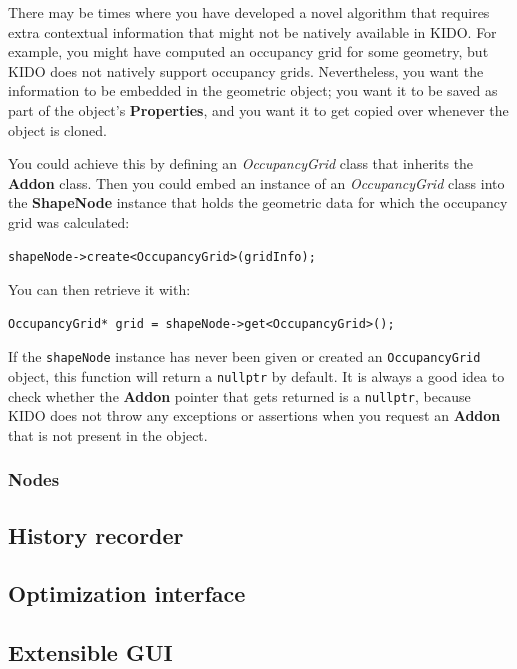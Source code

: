 There may be times where you have developed a novel algorithm that requires extra contextual information that might not be natively available in KIDO. For example, you might have computed an occupancy grid for some geometry, but KIDO does not natively support occupancy grids. Nevertheless, you want the information to be embedded in the geometric object; you want it to be saved as part of the object's \textbf{Properties}, and you want it to get copied over whenever the object is cloned.

You could achieve this by defining an \textit{OccupancyGrid} class that inherits the \textbf{Addon} class. Then you could embed an instance of an \textit{OccupancyGrid} class into the \textbf{ShapeNode} instance that holds the geometric data for which the occupancy grid was calculated:

\begin{lstlisting}
shapeNode->create<OccupancyGrid>(gridInfo);
\end{lstlisting}

You can then retrieve it with:

\begin{lstlisting}
OccupancyGrid* grid = shapeNode->get<OccupancyGrid>();
\end{lstlisting}

If the \texttt{shapeNode} instance has never been given or created an \texttt{OccupancyGrid} object, this function will return a \texttt{nullptr} by default. It is always a good idea to check whether the \textbf{Addon} pointer that gets returned is a \texttt{nullptr}, because KIDO does not throw any exceptions or assertions when you request an \textbf{Addon} that is not present in the object.

\subsubsection{Nodes}
\label{sec:nodes}
\subsection{History recorder}
\subsection{Optimization interface}
\label{sec:optimizer}
\subsection{Extensible GUI}
